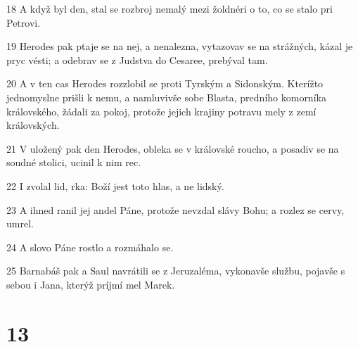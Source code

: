 \par 18 A když byl den, stal se rozbroj nemalý mezi žoldnéri o to, co se stalo pri Petrovi.
\par 19 Herodes pak ptaje se na nej, a nenalezna, vytazovav se na strážných, kázal je pryc vésti; a odebrav se z Judstva do Cesaree, prebýval tam.
\par 20 A v ten cas Herodes rozzlobil se proti Tyrským a Sidonským. Kterížto jednomyslne prišli k nemu, a namluvivše sobe Blasta, predního komorníka královského, žádali za pokoj, protože jejich krajiny potravu mely z zemí královských.
\par 21 V uložený pak den Herodes, obleka se v královské roucho, a posadiv se na soudné stolici, ucinil k nim rec.
\par 22 I zvolal lid, rka: Boží jest toto hlas, a ne lidský.
\par 23 A ihned ranil jej andel Páne, protože nevzdal slávy Bohu; a rozlez se cervy, umrel.
\par 24 A slovo Páne rostlo a rozmáhalo se.
\par 25 Barnabáš pak a Saul navrátili se z Jeruzaléma, vykonavše službu, pojavše s sebou i Jana, kterýž príjmí mel Marek.

\chapter{13}

